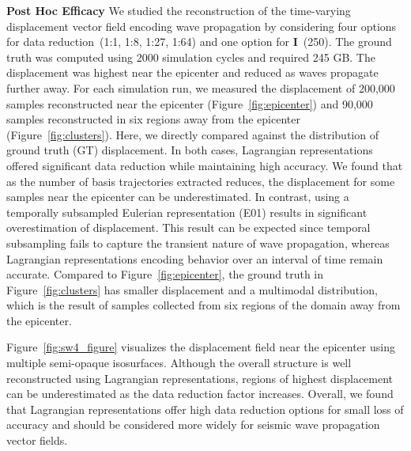 


\noindent\textbf{Post Hoc Efficacy}
We studied the reconstruction of the time-varying displacement vector field encoding wave propagation by considering four options for data reduction~(1:1, 1:8, 1:27, 1:64) and one option for \textbf{I}~(250).
%
The ground truth was computed using 2000 simulation cycles and required 245 GB.
%
The displacement was highest near the epicenter and reduced as waves propagate further away.
%
For each simulation run, we measured the displacement of 200,000 samples reconstructed near the epicenter (Figure~\ref{fig:epicenter}) and 90,000 samples reconstructed in six regions away from the epicenter (Figure~\ref{fig:clusters}).
%
Here, we directly compared against the distribution of ground truth (GT) displacement.
%
In both cases, Lagrangian representations offered significant data reduction while maintaining high accuracy.
%
We found that as the number of basis trajectories extracted reduces, the displacement for some samples near the epicenter can be underestimated. 
%
In contrast, using a temporally subsampled Eulerian representation (E01) results in significant overestimation of displacement.
%
This result can be expected since temporal subsampling fails to capture the transient nature of wave propagation, whereas Lagrangian representations encoding behavior over an interval of time remain accurate.
%
Compared to Figure~\ref{fig:epicenter}, the ground truth in Figure~\ref{fig:clusters} has smaller displacement and a multimodal distribution, which is the result of samples collected from six regions of the domain away from the epicenter. 
%

Figure~\ref{fig:sw4_figure} visualizes the displacement field near the epicenter using multiple semi-opaque isosurfaces.
%
Although the overall structure is well reconstructed using Lagrangian representations, regions of highest displacement can be underestimated as the data reduction factor increases.
%
Overall, we found that Lagrangian representations offer high data reduction options for small loss of accuracy and should be considered more widely for seismic wave propagation vector fields.


